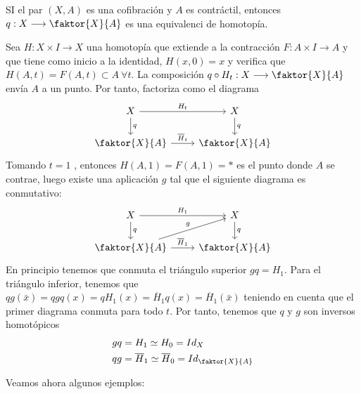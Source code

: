 \begin{teor}
SI el par $(X, A)$ es una cofibración y $A$ es contráctil, entonces $q : X \longrightarrow \faktor{X}{A}$ es una equivalenci de homotopía.
\end{teor}
\begin{demo}
Sea $H : X \times I \longrightarrow X$ una homotopía que extiende a la contracción $F : A \times I \longrightarrow A$ y que tiene como inicio a la identidad, $H(x,0) = x$ y verifica que $H(A,t) = F(A,t) \subset A \ \forall t$. La composición $ q \circ H_t : X \longrightarrow \faktor{X}{A}$ envía $A$ a un punto. Por tanto, factoriza como el diagrama
\[ \begin{tikzcd}
	X \rar{H_t} \dar{q} & X \dar{q} \\
	\faktor{X}{A} \rar{\overline{H}_t} & \faktor{X}{A}
\end{tikzcd} \]
Tomando $t = 1$ , entonces $H(A, 1) = F(A, 1) = \ast$ es el punto donde $A$ se contrae, luego existe una aplicación $g$ tal que el siguiente diagrama es conmutativo:
\[ \begin{tikzcd}
	X \rar{H_1} \dar{q} & X \dar{q} \\
	\faktor{X}{A} \rar{\overline{H}_1} \urar{g} & \faktor{X}{A}
\end{tikzcd} \]
En principio tenemos que conmuta el triángulo superior $gq = H_1$. Para el triángulo inferior, tenemos que $qg(\bar{x}) = qgq(x) = qH_1(x) =\overline{H}_1 q(x) = \overline{H}_1(\bar{x})  $ teniendo en cuenta que el primer diagrama conmuta para todo $t$. Por tanto, tenemos que $q$ y $g$ son inversos homotópicos
\begin{align*}
gq &= H_1 \simeq H_0 = Id_X \\
qg &= \overline{H}_1 \simeq \overline{H}_0 = Id_{\faktor{X}{A}}
\end{align*}
\end{demo}
Veamos ahora algunos ejemplos:

